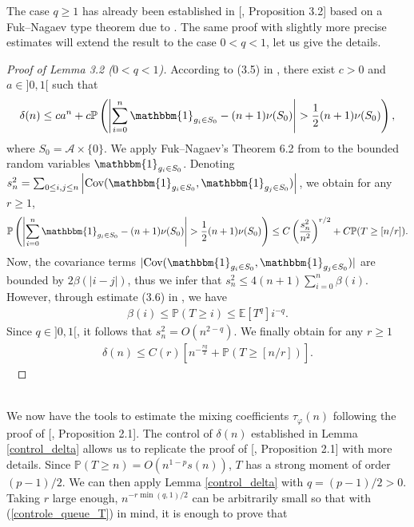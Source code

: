\documentclass{ws-sd}
\newcommand{\E}{\mathbb{E}}
\newcommand{\Proba}{\mathbb{P}}
\newcommand{\indic}{\mathbbm{1}}
\newcommand{\abs}[1]{\left\lvert #1 \right\rvert}
\newcommand\bigp[1]{\left(#1\right)}
\newcommand{\bigcro}[1]{\left[#1\right]}
\begin{document}
The case $q \ge 1$ has already been established in [, Proposition 3.2] based on a Fuk--Nagaev type theorem due to \cite{25}. The same proof with slightly more precise estimates will extend the result to the case $ 0 < q < 1$, let us give the details. 
\begin{proof}[Proof of Lemma 3.2 ($0<q<1$)]
According to (3.5) in \cite{4}, there exist $c > 0$ and $a \in ]0,1[$ such that
\begin{align*}
    \delta(n) \le c a^n + c \Proba \left( \abs{ \sum_{i=0}^{n} \indic_{g_i \in S_0} - (n+1)\nu(S_0)} > \frac{1}{2}(n+1)\nu(S_0) \right),
\end{align*}
where $S_0 = \mathcal{A} \times \{0\}$.
We apply Fuk--Nagaev's Theorem 6.2 from \cite{25} to the bounded random variables $\indic_{g_i \in S_0}$. Denoting
    $s_n^2 = \sum_{0\le i,j \le n} \abs{\text{Cov}(\indic_{g_i \in S_0}, \indic_{g_j \in S_0})}$,
we obtain for any $r \ge 1$,
\begin{align*}
    \Proba \bigp{ \abs{ \sum_{i=0}^{n} \indic_{g_i \in S_0} - (n+1)\nu(S_0)} > \frac{1}{2}(n+1)\nu(S_0) } \le C\bigp{\frac{s_n^2}{n^2}}^{r/2} + C\Proba(T \ge [n/r]).
\end{align*}
Now, the covariance terms $|\text{Cov}(\indic_{g_i \in S_0}, \indic_{g_j \in S_0})|$ are bounded by $2\beta(|i-j|)$, thus we infer that $s_n^2 \le 4(n+1)\sum_{i=0}^{n}\beta(i) $.
However, through estimate (3.6) in \cite{4}, we have
\begin{align}
        \label{control_beta}
    \beta(i) \le \Proba(T\ge i) \le \E[T^{q}]i^{-q}.
\end{align}
Since $q \in ]0,1[$, it follows that $s_n^2 = O(n^{2-q})$.
We finally obtain for any $r \ge 1$
\begin{align*}
    \delta(n) \le C(r) \bigcro{n^{-\frac{rq}{2}} + \Proba(T \ge [n/r])}.
\end{align*}~
\end{proof}
~\\
We now have the tools to estimate the mixing coefficients $\tau_{\varphi}(n)$ following the proof of [, Proposition 2.1]{}.
The control of $\delta(n)$ established in Lemma \ref{control_delta} allows us to replicate the proof of [, Proposition 2.1] with more details. Since $\Proba(T \ge n) = O(n^{1-p}s(n))$, $T$ has a strong moment of order  $(p-1)/2$. We can then apply Lemma \ref{control_delta} with $q = (p-1)/2 > 0$. Taking $r$ large enough, $n^{-r\min(q,1)/2}$ can be arbitrarily small so that with (\ref{controle_queue_T}) in mind, it is enough to prove that
\end{document}
